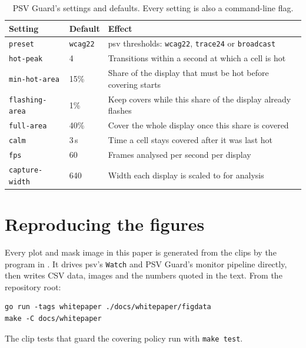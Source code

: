 \documentclass[11pt,a4paper]{article}
\newcommand{\psv}{\textsf{psv}}
\newcommand{\guard}{PSV Guard}
\newcommand{\code}[1]{\texttt{#1}}
\begin{document}
\begin{table}[H]
  \centering\small
  \caption{\guard{}'s settings and defaults. Every setting is also a command-line flag.}
  \begin{tabularx}{\linewidth}{@{}llX@{}}
    \toprule
    Setting & Default & Effect \\
    \midrule
    \code{preset} & \code{wcag22} & \psv{} thresholds: \code{wcag22}, \code{trace24} or \code{broadcast} \\
    \code{hot-peak} & 4 & Transitions within a second at which a cell is hot \\
    \code{min-hot-area} & 15\% & Share of the display that must be hot before covering starts \\
    \code{flashing-area} & 1\% & Keep covers while this share of the display already flashes \\
    \code{full-area} & 40\% & Cover the whole display once this share is covered \\
    \code{calm} & 3\,s & Time a cell stays covered after it was last hot \\
    \code{fps} & 60 & Frames analysed per second per display \\
    \code{capture-width} & 640 & Width each display is scaled to for analysis \\
    \bottomrule
  \end{tabularx}
\end{table}

\section{Reproducing the figures}
\label{app:repro}

Every plot and mask image in this paper is generated from the clips by the program in . It drives \psv{}'s \code{Watch} and \guard{}'s monitor pipeline directly, then writes CSV data, images and the numbers quoted in the text. From the repository root:

\begin{verbatim}
go run -tags whitepaper ./docs/whitepaper/figdata
make -C docs/whitepaper
\end{verbatim}

The clip tests that guard the covering policy run with \code{make test}.
\end{document}
